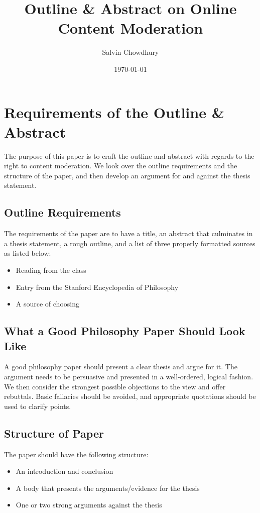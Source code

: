 \documentclass[a4paper]{article}
\title{Outline \& Abstract on Online Content Moderation}
\author{Salvin Chowdhury}
\date{\today}
\begin{document}
\maketitle

\newpage
\tableofcontents
\newpage

\section{Requirements of the Outline \& Abstract}
The purpose of this paper is to craft the outline and abstract with regards to the right to content moderation. We 
look over the outline requirements and the structure of the paper, and then develop an argument for and against the 
thesis statement.

\subsection{Outline Requirements}
The requirements of the paper are to have a title, an abstract that culminates in a thesis statement, a rough outline,
and a list of three properly formatted sources as listed below:
\begin{itemize}
    \item Reading from the class
    \item Entry from the Stanford Encyclopedia of Philosophy
    \item A source of choosing
\end{itemize}

\subsection{What a Good Philosophy Paper Should Look Like}
A good philosophy paper should present a clear thesis and argue for it. The argument needs to be persuasive and 
presented in a well-ordered, logical fashion. We then consider the strongest possible objections to the view and offer
rebuttals. Basic fallacies should be avoided, and appropriate quotations should be used to clarify points.

\subsection{Structure of Paper}
The paper should have the following structure:
\begin{itemize}
    \item An introduction and conclusion
    \item A body that presents the arguments/evidence for the thesis
    \item One or two strong arguments against the thesis
\end{itemize}
\end{document}
